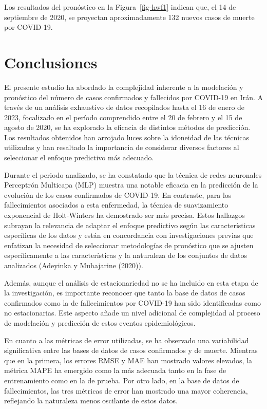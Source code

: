 \documentclass[
  us-letterpaper,
]{scrreprt}
\theoremstyle{plain}
\theoremstyle{definition}
\theoremstyle{definition}
\theoremstyle{plain}
\theoremstyle{remark}
\begin{document}
Los resultados del pronóstico en la Figura~\ref{fig-hwf1} indican que,
el 14 de septiembre de 2020, se proyectan aproximadamente 132 nuevos
casos de muerte por COVID-19.


\chapter{Conclusiones}\label{conclusiones}

El presente estudio ha abordado la complejidad inherente a la modelación
y pronóstico del número de casos confirmados y fallecidos por COVID-19
en Irán. A través de un análisis exhaustivo de datos recopilados hasta
el 16 de enero de 2023, focalizado en el período comprendido entre el 20
de febrero y el 15 de agosto de 2020, se ha explorado la eficacia de
distintos métodos de predicción. Los resultados obtenidos han arrojado
luces sobre la idoneidad de las técnicas utilizadas y han resaltado la
importancia de considerar diversos factores al seleccionar el enfoque
predictivo más adecuado.

Durante el periodo analizado, se ha constatado que la técnica de redes
neuronales Perceptrón Multicapa (MLP) muestra una notable eficacia en la
predicción de la evolución de los casos confirmados de COVID-19. En
contraste, para los fallecimientos asociados a esta enfermedad, la
técnica de suavizamiento exponencial de Holt-Winters ha demostrado ser
más precisa. Estos hallazgos subrayan la relevancia de adaptar el
enfoque predictivo según las características específicas de los datos y
están en concordancia con investigaciones previas que enfatizan la
necesidad de seleccionar metodologías de pronóstico que se ajusten
específicamente a las características y la naturaleza de los conjuntos
de datos analizados (Adeyinka y Muhajarine (2020)).

Además, aunque el análisis de estacionariedad no se ha incluido en esta
etapa de la investigación, es importante reconocer que tanto la base de
datos de casos confirmados como la de fallecimientos por COVID-19 han
sido identificadas como no estacionarias. Este aspecto añade un nivel
adicional de complejidad al proceso de modelación y predicción de estos
eventos epidemiológicos.

En cuanto a las métricas de error utilizadas, se ha observado una
variabilidad significativa entre las bases de datos de casos confirmados
y de muerte. Mientras que en la primera, los errores RMSE y MAE han
mostrado valores elevados, la métrica MAPE ha emergido como la más
adecuada tanto en la fase de entrenamiento como en la de prueba. Por
otro lado, en la base de datos de fallecimientos, las tres métricas de
error han mostrado una mayor coherencia, reflejando la naturaleza menos
oscilante de estos datos.
\end{document}
